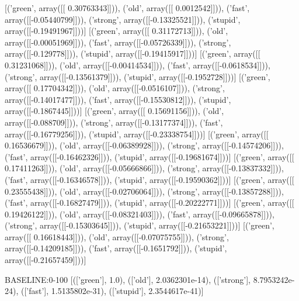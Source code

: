 [('green', array([[ 0.30763343]])), ('old', array([[ 0.0012542]])), ('fast', array([[-0.05440799]])), ('strong', array([[-0.13325521]])), ('stupid', array([[-0.19491967]]))]
[('green', array([[ 0.31172713]])), ('old', array([[-0.00051969]])), ('fast', array([[-0.05726339]])), ('strong', array([[-0.129778]])), ('stupid', array([[-0.19415917]]))]
[('green', array([[ 0.31231068]])), ('old', array([[-0.00414534]])), ('fast', array([[-0.0618534]])), ('strong', array([[-0.13561379]])), ('stupid', array([[-0.1952728]]))]
[('green', array([[ 0.17704342]])), ('old', array([[-0.0516107]])), ('strong', array([[-0.14017477]])), ('fast', array([[-0.15530812]])), ('stupid', array([[-0.1867445]]))]
[('green', array([[ 0.15691156]])), ('old', array([[-0.088709]])), ('strong', array([[-0.13177374]])), ('fast', array([[-0.16779256]])), ('stupid', array([[-0.23338754]]))]
[('green', array([[ 0.16536679]])), ('old', array([[-0.06389928]])), ('strong', array([[-0.14574206]])), ('fast', array([[-0.16462326]])), ('stupid', array([[-0.19681674]]))]
[('green', array([[ 0.17411263]])), ('old', array([[-0.05666866]])), ('strong', array([[-0.13837332]])), ('fast', array([[-0.16346578]])), ('stupid', array([[-0.19590362]]))]
[('green', array([[ 0.23555438]])), ('old', array([[-0.02706064]])), ('strong', array([[-0.13857288]])), ('fast', array([[-0.16827479]])), ('stupid', array([[-0.20222771]]))]
[('green', array([[ 0.19426122]])), ('old', array([[-0.08321403]])), ('fast', array([[-0.09665878]])), ('strong', array([[-0.15303645]])), ('stupid', array([[-0.21653221]]))]
[('green', array([[ 0.16618443]])), ('old', array([[-0.07075755]])), ('strong', array([[-0.14209185]])), ('fast', array([[-0.1651792]])), ('stupid', array([[-0.21657459]]))]

BASELINE:0-100
[(['green'], 1.0), (['old'], 2.0362301e-14), (['strong'], 8.7953242e-24), (['fast'], 1.5135802e-31), (['stupid'], 2.3544617e-41)]
